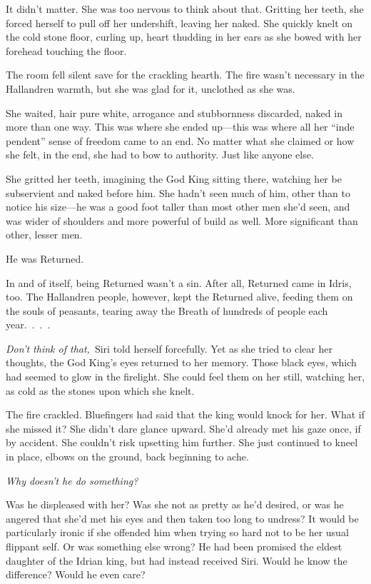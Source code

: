 It didn’t matter. She was too nervous to think about that. Gritting her teeth, she forced herself to pull off her undershift, leaving her naked. She quickly knelt on the cold stone floor, curling up, heart thudding in her ears as she bowed with her forehead touching the floor.

The room fell silent save for the crackling hearth. The fire wasn’t necessary in the Hallandren warmth, but she was glad for it, unclothed as she was.

She waited, hair pure white, arrogance and stubbornness discarded, naked in more than one way. This was where she ended up—this was where all her “inde pendent” sense of freedom came to an end. No matter what she claimed or how she felt, in the end, she had to bow to authority. Just like anyone else.

She gritted her teeth, imagining the God King sitting there, watching her be subservient and naked before him. She hadn’t seen much of him, other than to notice his size—he was a good foot taller than most other men she’d seen, and was wider of shoulders and more powerful of build as well. More significant than other, lesser men.

He was Returned.

In and of itself, being Returned wasn’t a sin. After all, Returned came in Idris, too. The Hallandren people, however, kept the Returned alive, feeding them on the souls of peasants, tearing away the Breath of hundreds of people each year.~.~.~.

\textit{Don’t think of that,}~Siri told herself forcefully. Yet as she tried to clear her thoughts, the God King’s eyes returned to her memory. Those black eyes, which had seemed to glow in the firelight. She could feel them on her still, watching her, as cold as the stones upon which she knelt.

The fire crackled. Bluefingers had said that the king would knock for her. What if she missed it? She didn’t dare glance upward. She’d already met his gaze once, if by accident. She couldn’t risk upsetting him further. She just continued to kneel in place, elbows on the ground, back beginning to ache.

\textit{Why doesn’t he do something?}

Was he displeased with her? Was she not as pretty as he’d desired, or was he angered that she’d met his eyes and then taken too long to undress? It would be particularly ironic if she offended him when trying so hard not to be her usual flippant self. Or was something else wrong? He had been promised the eldest daughter of the Idrian king, but had instead received Siri. Would he know the difference? Would he even care?

